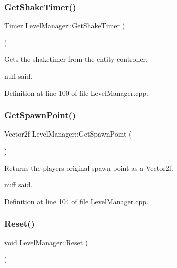 \subsubsection{\texorpdfstring{Get\+Shake\+Timer()}{GetShakeTimer()}}
{\footnotesize\ttfamily \hyperlink{struct_timer}{Timer} Level\+Manager\+::\+Get\+Shake\+Timer (\begin{DoxyParamCaption}{ }\end{DoxyParamCaption})}



Gets the shaketimer from the entity controller. 

\textquotesingle{}nuff said. 

Definition at line 100 of file Level\+Manager.\+cpp.

\mbox{\label{class_level_manager_a6e8ba28b3df63a8babb0cb3551d5660c}} 
\subsubsection{\texorpdfstring{Get\+Spawn\+Point()}{GetSpawnPoint()}}
{\footnotesize\ttfamily Vector2f Level\+Manager\+::\+Get\+Spawn\+Point (\begin{DoxyParamCaption}{ }\end{DoxyParamCaption})}



Returns the player\textquotesingle{}s original spawn point as a Vector2f. 

\textquotesingle{}nuff said. 

Definition at line 104 of file Level\+Manager.\+cpp.

\mbox{\label{class_level_manager_a5e1dd3b7ca877857f1246c7fc95b6a3f}} 
\subsubsection{\texorpdfstring{Reset()}{Reset()}}
{\footnotesize\ttfamily void Level\+Manager\+::\+Reset (\begin{DoxyParamCaption}{ }\end{DoxyParamCaption})\hspace{0.3cm}{\ttfamily [virtual]}}



